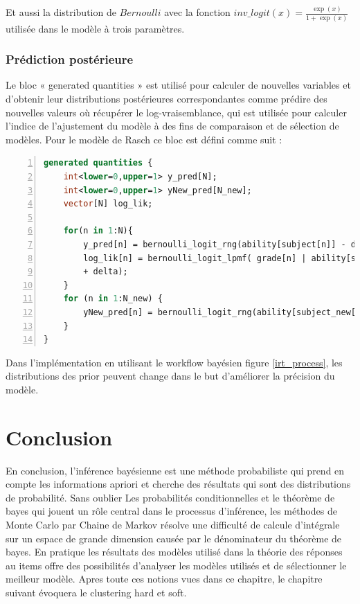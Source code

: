 \noindent Et aussi la distribution de \(\displaystyle Bernoulli \) avec la fonction \(\displaystyle inv\_logit(x) = \frac{\exp(x)}{1+ \exp(x)}  \) utilisée dans le modèle à trois paramètres.
\subsubsection{Prédiction postérieure}
Le bloc « generated quantities » est utilisé pour calculer de nouvelles variables et d'obtenir leur distributions postérieures correspondantes comme prédire des nouvelles valeurs où récupérer le log-vraisemblance, qui est utilisée pour calculer l’indice de l'ajustement du modèle à des fins de comparaison et de sélection de modèles. Pour le modèle de Rasch ce bloc est défini comme suit :

\begin{lstlisting}[language=Stan,label={generated_quantities},basicstyle=\scriptsize, frame=l,framesep=4.5mm,framexleftmargin=2.5mm,tabsize=2,numbers=left,fillcolor=\color{blueforest!70},rulecolor=\color{blueforest},numberstyle=\normalfont\tiny\color{white}]
generated quantities {
	int<lower=0,upper=1> y_pred[N];
	int<lower=0,upper=1> yNew_pred[N_new];
	vector[N] log_lik;

	for(n in 1:N){
		y_pred[n] = bernoulli_logit_rng(ability[subject[n]] - difficulty[item[n]] + delta);
		log_lik[n] = bernoulli_logit_lpmf( grade[n] | ability[subject[n]] - difficulty[item[n]]
		+ delta);
	}
	for (n in 1:N_new) {
		yNew_pred[n] = bernoulli_logit_rng(ability[subject_new[n]] - difficulty[item_new[n]] + delta);                                             
	}
}
\end{lstlisting}
Dans l’implémentation en utilisant le workflow bayésien figure \ref{irt_process}, les distributions des prior peuvent change dans le but d’améliorer la précision du modèle.
\section{Conclusion}
En conclusion, l’inférence bayésienne est une méthode probabiliste qui prend en compte les informations apriori et cherche des résultats qui sont des distributions de probabilité. Sans oublier Les probabilités conditionnelles et le théorème de bayes qui jouent un rôle central dans le processus d’inférence, les méthodes de Monte Carlo par Chaine de Markov résolve une difficulté de calcule d’intégrale sur un espace de grande dimension causée par le dénominateur du théorème de bayes. En pratique les résultats des modèles utilisé dans la théorie des réponses au items offre des possibilités d’analyser les modèles utilisés et de sélectionner le meilleur modèle. Apres toute ces notions vues dans ce chapitre, le chapitre suivant évoquera le clustering hard et soft.
